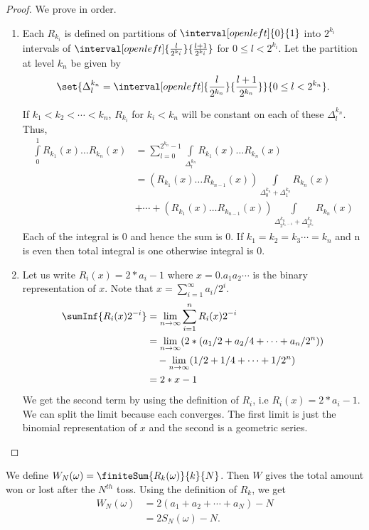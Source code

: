 \begin{proof}
    We prove in order.
    \begin{enumerate}
	\item
	   Each $R_{k_i}$ is defined on partitions of $\interval[open left]{0}{1}$ into $2^{k_i}$ 
	   intervals of $\interval[open left]{\frac{l}{2^{k_i}}}{\frac{l+1}{2^{k_i}}}$ 
	   for $0 \leq l < 2^{k_i}$. Let the partition at level 
	   $k_n$ be given by 
	   \[\set{\Delta_{l}^{k_n} = \interval[open
	       left]{\frac{l}{2^{k_n}}}{\frac{l+1}{2^{k_n}}}}{0 \leq l < 2^{k_n}}.\] 
       
           If $k_1 < k_2 < \cdots < k_n$, $R_{k_i}$ for $k_i < k_n$ will be constant on each of these 
	   $\Delta_{l}^{k_n}$. Thus,
	   \begin{align*} 
	       \int\limits_{0}^{1}R_{k_1}(x)\dots R_{k_n}(x) & = \sum\limits_{l =
		   0}^{2^{k_n}-1}\int\limits_{\Delta_{l}^{k_n}}R_{k_1}(x)\dots R_{k_n}(x) \\
	       & = (R_{k_1}(x)\dots R_{k_{n-1}}(x))\int\limits_{\Delta_{0}^{k_n} + \Delta_{1}^{k_n}
	       }R_{k_n}(x) \\
	       & + \cdots + (R_{k_1}(x)\dots R_{k_{n-1}}(x))
	       \int\limits_{\Delta_{2^{k_n-1}}^{k_n} + \Delta_{2^{k_n}}^{k_n}}R_{k_n}(x)
	   \end{align*}  
	   Each of the integral is $0$ and hence the sum
	   is 0. If $k_1 = k_2 = k_3
	   \cdots = k_n$ and n is even then total integral is one otherwise integral is $0$.
       \item
	   Let us write $R_i(x) = 2*a_i - 1$ where $x = 0.a_1a_2\cdots$ is the binary
	   representation of $x$. Note that $x = \sum\limits_{i = 1}^{\infty}a_i/2^i$.
	   \begin{align*}
	       \sumInf{R_i(x)2^{-i}} &= \lim\limits_{n\to\infty}\sum\limits_{i=1}^{n}R_i(x)2^{-i} \\
	       &= \lim\limits_{n\to\infty}(2*(a_1/2 + a_2/4 + \cdots + a_n/2^n))\\ 
	       &\quad - \lim\limits_{n\to\infty}(1/2 + 1/4 + \cdots + 1/2^n) \\
	       & = 2*x - 1 
	   \end{align*}
	   We get the second term by using the definition of $R_i$, i.e $R_i(x) = 2*a_i - 1$. We can
	   split the limit because each converges. The first limit is just the binomial
	   representation of $x$ and the second is a geometric series.
    \end{enumerate}
\end{proof}
\begin{Definition}
    We define $W_N(\omega) = \finiteSum{R_k(\omega)}{k}{N}$. Then $W$ gives the total amount won or
    lost after the $N^{th}$ toss. Using the definition of $R_k$, we get
    \begin{align*}
	W_N(\omega) &= 2(a_1 + a_2 + \cdots + a_N) - N \\
	&= 2S_N(\omega) - N.
    \end{align*}
\end{Definition}
